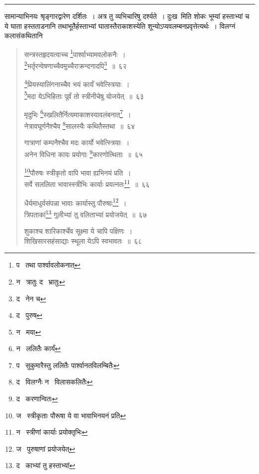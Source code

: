 \documentclass[11pt, openany]{book}
\begin{document}
\hrule

\vspace{2mm}
\noindent
सामान्याभिनयः श्रृङ्गारद्वारेण दर्शितः~। अत्र तु व्यभिचारिषु दर्श्यते~। दुःख\textendash\ मिति शोकः भूम्यां हस्ताभ्यां च ये घाता हस्तताडनानि तथाभूतैर्हस्ताभ्यां घातास्तैराकाशस्येति शून्योऽप्यवलम्बनप्रवृत्तेत्यर्थः~। विलग्नं कलासंकथितानि

\newpage

\begin{quote}
{\na सन्त्रस्तहृदयत्वाच्च \renewcommand{\thefootnote}{1}\footnote{प \textendash\  तथा पार्श्वावलोकनात्}पार्श्वाभ्यामवलोकनैः~।\\
\renewcommand{\thefootnote}{2}\footnote{न \textendash\  त्रातुः द \textendash\  भ्रातुः}भर्तृरन्वेषणाच्चैवमुच्चैराक्रन्दनादपि\renewcommand{\thefootnote}{3}\footnote{द \textendash\ नेन च}~॥~६२

\renewcommand{\thefootnote}{4}\footnote{द \textendash\  पुरुष}प्रियस्यालिंगनाच्चैव भयं कार्यं भवेत्स्त्रियाः~।\\
\renewcommand{\thefootnote}{5}\footnote{न \textendash\  मया}मदा येऽभिहिताः पूर्वं तो स्त्रीनीचेषु योजयेत्~॥~६३

मृदुभिः \renewcommand{\thefootnote}{6}\footnote{न \textendash\  ललितैः कार्यं}स्खलितैर्नित्यमाकाशस्यावलंबनात्\renewcommand{\thefootnote}{7}\footnote{प \textendash\  सुकुमारैस्तु ललितैः पार्श्वानतविलम्बितैः}~।\\
नेत्रावघूर्णनैश्चैव \renewcommand{\thefootnote}{8}\footnote{द \textendash\  विलग्नैः न \textendash\  विलासकलितैः}सालस्यैः कथितैस्तथा~॥~६४

गात्राणां कम्पनैश्चैव मदः कार्यो भवेत्स्त्रियाः~।\\
अनेन विधिना कायः प्रयोगाः \renewcommand{\thefootnote}{9}\footnote{द \textendash\  करणान्वितः}कारणोत्थिताः~॥~६५

\renewcommand{\thefootnote}{10}\footnote{ज \textendash\  स्त्रीकृताः पौरूषा ये वा भावाभिनयनं प्रति}पौरुषः स्त्रीकृतो वापि भावा ह्यभिनयं प्रति~।\\
सर्वे सललिता भावास्स्त्रीभिः कार्याः प्रयत्नतः\renewcommand{\thefootnote}{11}\footnote{न \textendash\  स्त्रीणां कार्याः प्रयोक्तृभिः}~॥~६६

धैर्यमाधुर्यसंपन्ना भावाः कार्यास्तु पौरुषाः\renewcommand{\thefootnote}{12}\footnote{ज \textendash\  पुरुषाणां प्रयोजयेत्}~।\\
त्रिपताकां\renewcommand{\thefootnote}{13}\footnote{द \textendash\  काभ्यां तु हस्ताभ्यां} गुलीभ्यां तु वलिताभ्यां प्रयोजयेत्~॥~६७

शुकाश्च शारिकार्श्चेव सूक्ष्मा ये चापि पक्षिणः~।\\
शिखिसारसहंसाद्याः स्थूला येऽपि स्वभावतः~॥~६८}
\end{quote}
\end{document}
